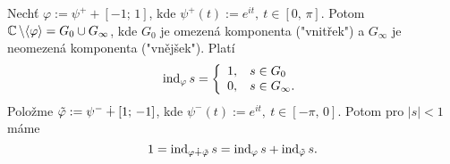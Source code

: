 \begin{example}
Nechť $\varphi:=\psi^++[-1;\,1]$, kde $\psi^+(t):=e^{it},\ t\in[0,\,\pi]$. Potom $\operatorname{\mathbb{C}} \backslash\langle{\varphi}\rangle=G_0\cup{G_\infty}$, kde $G_0$ je omezená komponenta ("vnitřek") a $G_\infty$ je neomezená komponenta ("vnějšek"). Platí
$$\operatorname{ind}_\varphi{s}=
\left\{
\begin{array}{ll}
1, \hspace{3mm} s\in{G_0}\\
0, \hspace{3mm} s\in{G_\infty}.
\end{array}
\right.$$
Položme $\Tilde{\varphi}:=\psi^-\dotplus[1;\,-1]$,
kde $\psi^-(t):=e^{it},\ t\in[-\pi,\,0]$. Potom pro $|s|<1$ máme 
$$1=\operatorname{ind}_{\varphi\dotplus\tilde\varphi}{s}=\operatorname{ind}_\varphi{s}+\operatorname{ind}_{\tilde{\varphi}}{s}.$$
\end{example}

